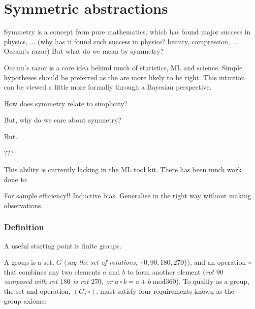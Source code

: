 \newpage
\section{Symmetric abstractions}\label{symmetric-abstractions}



Symmetry is a concept from pure mathematics, which has found major success in physics, ...
(why has it found such success in physics? beauty, compression, ... Occam's razor)
But what do we mean by symmetry?



Occam's razor is a core idea behind much of statistics, ML and science. Simple
hypotheses should be preferred as the are more likely to be right. This intuition
can be viewed a little more formally through a Bayesian perspective.

How does symmetry relate to simplicity?

But, why do we care about symmetry?

But.

???

This ability is currently lacking in the ML tool kit. There has been much work done to

For sample efficiency!! Inductive bias. Generalise in the right way without making observations.

\subsubsection{Definition}

A useful starting point is finite groups.

A group is a set, $G$ (\textit{say the set of rotations, $\{0, 90, 180, 270\}$}),
and an operation $\circ$ that combines any two elements $a$ and $b$ to form
another element (\textit{rot $90$ composed with rot $180$ is rot $270$, or} $a \circ b = a + b \;\text{mod} 360$).
To qualify as a group, the set and operation, $(G, \circ)$, must satisfy four requirements known as the group axioms:

